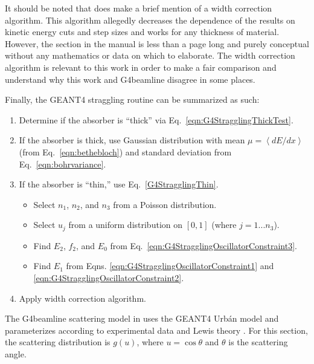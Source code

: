 It should be noted that \cite{geant4} does make a brief mention of a width correction algorithm. This algorithm allegedly decreases the dependence of the results on kinetic energy cuts and step sizes and works for any thickness of material. However, the section in the manual is less than a page long and purely conceptual without any mathematics or data on which to elaborate. The width correction algorithm is relevant to this work in order to make a fair comparison and understand why this work and G4beamline disagree in some places.

Finally, the GEANT4 straggling routine can be summarized as such:
\begin{enumerate}
\item{Determine if the absorber is ``thick'' via Eq.~\eqref{eqn:G4StragglingThickTest}.}
\item{If the absorber is thick, use Gaussian distribution with mean $\mu = \left<dE/dx\right>$ (from Eq.~\eqref{eqn:bethebloch}) and standard deviation from Eq.~\eqref{eqn:bohrvariance}.}
\item{If the absorber is ``thin,'' use Eq.~\eqref{G4StragglingThin}.
	\begin{itemize}
	\item{Select $n_1$, $n_2$, and $n_3$ from a Poisson distribution.}
	\item{Select $u_j$ from a uniform distribution on $[0,1]$ (where $j=1...n_3$).}
	\item{Find $E_2$, $f_2$, and $E_0$ from Eq.~\eqref{eqn:G4StragglingOscillatorConstraint3}.} 
	\item{Find $E_1$ from Eqns. \ref{eqn:G4StragglingOscillatorConstraint1} and \ref{eqn:G4StragglingOscillatorConstraint2}.}
	\end{itemize}
	}
\item{Apply width correction algorithm.}
\end{enumerate}
 \label{sec:g4blscattering}\par
The G4beamline scattering model in \cite{g4bl} uses the GEANT4 Urb\'{a}n model \cite{geant4} and parameterizes according to experimental data and Lewis theory \cite{lewis}. For this section, the scattering distribution is $g(u)$, where $u=\cos\theta$ and $\theta$ is the scattering angle.

